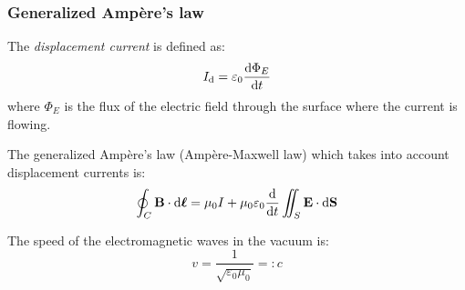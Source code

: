 \documentclass[../../../main.tex]{subfiles}
\begin{document}
\begin{multicols}{2}
  \subsubsection{Generalized Ampère's law}
  \begin{definition}
    The \textit{displacement current} is defined as: $$I_\text{d}=\varepsilon_0\dv{\Phi_E}{t}$$ where $\Phi_E$ is the flux of the electric field through the surface where the current is flowing.
  \end{definition}
  \begin{law}
    The generalized Ampère's law (Ampère-Maxwell law) which takes into account displacement currents is: $$\oint_C\boldsymbol{\mathrm{B}}\cdot \dd\vb*{\ell}=\mu_0 I+\mu_0\varepsilon_0\dv{}{t}\iint_S\boldsymbol{\mathrm{E}}\cdot \dd\boldsymbol{\mathrm{S}}$$
  \end{law}
  \begin{definition}
    The speed of the electromagnetic waves in the vacuum is: $$v=\frac{1}{\sqrt{\varepsilon_0\mu_0}}=:c$$
  \end{definition}
\end{multicols}
\end{document}
